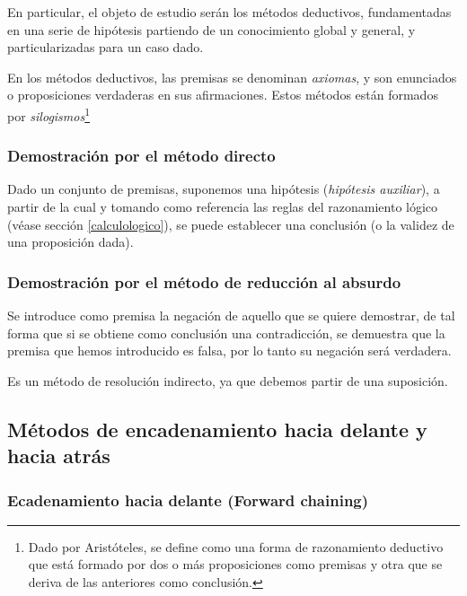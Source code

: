 \documentclass[a4paper, 11pt, titlepage]{article}
\begin{document}
        En particular, el objeto de estudio serán los métodos deductivos, fundamentadas en una 
        serie de hipótesis partiendo de un conocimiento global y general, y particularizadas para 
        un caso dado.

        En los métodos deductivos, las premisas se denominan \textit{axiomas}, y son enunciados 
        o proposiciones verdaderas en sus afirmaciones. Estos métodos están formados por 
        \textit{silogismos}\footnote{
            Dado por Aristóteles, se define como una forma de razonamiento deductivo que está 
            formado por dos o más proposiciones como premisas y otra que se deriva de las anteriores 
            como conclusión.
        }

        \subsubsection{Demostración por el método directo}

            Dado un conjunto de premisas, suponemos una hipótesis (\textit{hipótesis auxiliar}), a 
            partir de la cual y tomando como referencia las reglas del razonamiento lógico (véase 
            sección \ref{calculologico}), se puede establecer una conclusión (o la validez de una 
            proposición dada).

        \subsubsection{Demostración por el método de reducción al absurdo}

            Se introduce como premisa la negación de aquello que se quiere demostrar, de tal 
            forma que si se obtiene como conclusión una contradicción, se demuestra que la premisa 
            que hemos introducido es falsa, por lo tanto su negación será verdadera.

            Es un método de resolución indirecto, ya que debemos partir de una suposición.

    \subsection{Métodos de encadenamiento hacia delante y hacia atrás}

        \subsubsection{Ecadenamiento hacia delante (Forward chaining)}\label{encadenamiento_delante}
\end{document}
